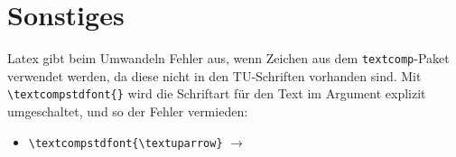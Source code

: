 \section*{Sonstiges}
Latex gibt beim Umwandeln \zT Fehler aus, wenn Zeichen aus dem \texttt{textcomp}-Paket verwendet werden, da diese nicht in den TU-Schriften vorhanden sind.
Mit \verb|\textcompstdfont{}| wird die Schriftart für den Text im Argument explizit umgeschaltet, und so der Fehler vermieden:
\begin{itemize}
	\item \verb|\textcompstdfont{\textuparrow}| $\rightarrow$ \textcompstdfont{\textuparrow}
\end{itemize}